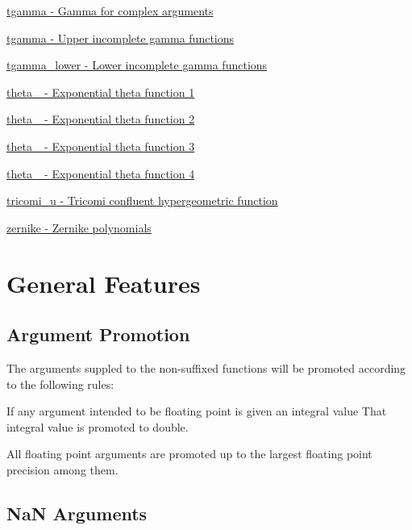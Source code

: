 \begin{DoxyItemize}
\item \hyperlink{group__gnu__math__spec__func_gac76f330d5eed535fc5936b9625099fdf}{tgamma -\/ Gamma for complex arguments}
\item \hyperlink{group__gnu__math__spec__func_gac76f330d5eed535fc5936b9625099fdf}{tgamma -\/ Upper incomplete gamma functions}
\item \hyperlink{group__gnu__math__spec__func_ga973fba718e906a5179d954c56b991c8d}{tgamma\+\_\+lower -\/ Lower incomplete gamma functions}
\item \hyperlink{group__gnu__math__spec__func_gac122af3ffd2e5536fdf021afce79b7d4}{theta\+\_ -\/ Exponential theta function 1}
\item \hyperlink{group__gnu__math__spec__func_gacec36dc316e561bbaa371c60c06e52f7}{theta\+\_ -\/ Exponential theta function 2}
\item \hyperlink{group__gnu__math__spec__func_ga34e5d79e6ba8b8b104e690fc1ebc7fd6}{theta\+\_ -\/ Exponential theta function 3}
\item \hyperlink{group__gnu__math__spec__func_ga25e72f2b50b53d168f8fa653b1a0d012}{theta\+\_ -\/ Exponential theta function 4}
\item \hyperlink{group__gnu__math__spec__func_gaa1fda5b87a8c44debac679331bebfb11}{tricomi\+\_\+u -\/ Tricomi confluent hypergeometric function}
\item \hyperlink{group__gnu__math__spec__func_ga5df3bb50b78cd1bc676763dbf9e64929}{zernike -\/ Zernike polynomials}
\end{DoxyItemize}\hypertarget{index_general}{}\section{General Features}\label{index_general}
\hypertarget{index_promotion}{}\subsection{Argument Promotion}\label{index_promotion}
The arguments suppled to the non-\/suffixed functions will be promoted according to the following rules\+:
\begin{DoxyEnumerate}
\item If any argument intended to be floating point is given an integral value That integral value is promoted to double.
\item All floating point arguments are promoted up to the largest floating point precision among them.
\end{DoxyEnumerate}\hypertarget{index_NaN}{}\subsection{Na\+N Arguments}\label{index_NaN}
